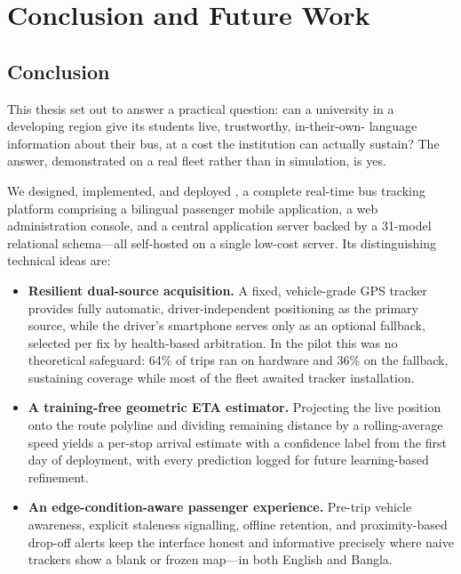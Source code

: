 \chapter{Conclusion and Future Work}
\label{ch:conclusion}

\section{Conclusion}
This thesis set out to answer a practical question: can a university in
a developing region give its students live, trustworthy, in-their-own-
language information about their bus, at a cost the institution can
actually sustain? The answer, demonstrated on a real fleet rather than
in simulation, is yes.

We designed, implemented, and deployed \system{}, a complete real-time
bus tracking platform comprising a bilingual passenger mobile
application, a web administration console, and a central application
server backed by a 31-model relational schema---all self-hosted on a
single low-cost server. Its distinguishing technical ideas are:

\begin{itemize}
  \item \textbf{Resilient dual-source acquisition.} A fixed,
  vehicle-grade GPS tracker provides fully automatic, driver-independent
  positioning as the primary source, while the driver's smartphone
  serves only as an optional fallback, selected per fix by health-based
  arbitration. In the pilot this was no theoretical safeguard: 64\% of
  trips ran on hardware and 36\% on the fallback, sustaining coverage
  while most of the fleet awaited tracker installation.
  \item \textbf{A training-free geometric ETA estimator.} Projecting the
  live position onto the route polyline and dividing remaining distance
  by a rolling-average speed yields a per-stop arrival estimate with a
  confidence label from the first day of deployment, with every
  prediction logged for future learning-based refinement.
  \item \textbf{An edge-condition-aware passenger experience.} Pre-trip
  vehicle awareness, explicit staleness signalling, offline retention,
  and proximity-based drop-off alerts keep the interface honest and
  informative precisely where naive trackers show a blank or frozen
  map---in both English and Bangla.
\end{itemize}

